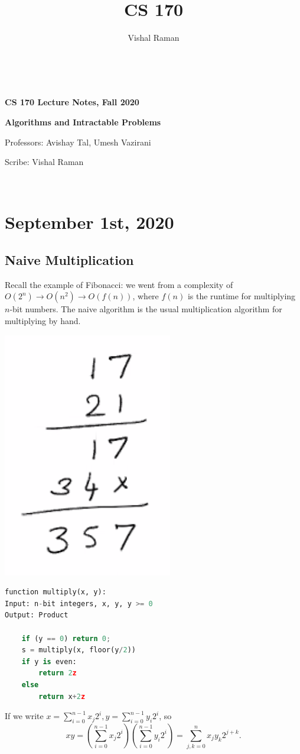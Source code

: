 \documentclass[11pt]{scrartcl}
\begin{document}
\title{CS 170}
\author{Vishal Raman}
\thispagestyle{empty}
$ $
\vfill
\begin{center}

\centerline{\huge \textbf{CS 170 Lecture Notes, Fall 2020}}
\centerline{\Large \textbf{Algorithms and Intractable Problems} } 
\centerline{Professors: Avishay Tal, Umesh Vazirani}
\centerline{Scribe: Vishal Raman}
\end{center}
\vfill
$ $
\newpage
\thispagestyle{empty}
\tableofcontents
\newpage
\section{September 1st, 2020}
\subsection{Naive Multiplication} 
Recall the example of Fibonacci: we went from a complexity of $O(2^n) \rightarrow O(n^2) \rightarrow O(f(n))$, where $f(n)$ is the runtime for multiplying $n$-bit numbers.  The naive algorithm is the usual multiplication algorithm for multiplying by hand.
\begin{center}
\includegraphics[scale=0.5]{multiply.png}
\end{center}
\begin{lstlisting}[language=python, caption={Naive n-bit multiplication}]
function multiply(x, y):
Input: n-bit integers, x, y, y >= 0
Output: Product

    if (y == 0) return 0;
    s = multiply(x, floor(y/2))
    if y is even:
    	return 2z
    else
    	return x+2z
\end{lstlisting}
If we write $x = \sum_{i=0}^{n-1} x_{j}2^i, y = \sum_{i=0}^{n-1} y_i 2^i$, so 
$$xy = \left (\sum_{i=0}^{n-1} x_{j}2^i\right )\left (\sum_{i=0}^{n-1} y_i 2^i\right ) = \sum_{j, k = 0}^n x_jy_k 2^{j+k}.$$
\end{document}
